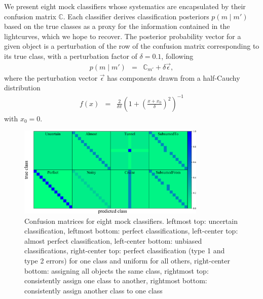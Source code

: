 We present eight mock classifiers whose systematics are encapsulated by their confusion matrix $\mathbb{C}$.
Each classifier derives classification posteriors $p(m \mid m')$ based on the true classes as a proxy for the information contained in the lightcurves, which we hope to recover.
The posterior probability vector for a given object is a perturbation of the row of the confusion matrix corresponding to its true class, with a perturbation factor of $\delta=0.1$, following
\begin{eqnarray}
  \label{eq:cmtoprob}
  p(m \mid m') &=& \mathbb{C}_{m'} + \delta\vec{\epsilon},
\end{eqnarray}
where the perturbation vector $\vec{\epsilon}$ has components drawn from a half-Cauchy distribution
\begin{eqnarray}
  \label{eq:cauchy}
  f(x) &=& \frac{2}{\delta\pi} \left(1+\left(\frac{x+x_{0}}{\delta}\right)^{2}\right)^{-1}
\end{eqnarray}
with $x_{0}=0$.


\begin{figure}
	\begin{center}
    \includegraphics[width=0.8\textwidth]{./fig/all_sim_cm.png}
		\caption{Confusion matrices for eight mock classifiers.
    leftmost top: uncertain classification,
    leftmost bottom: perfect classifications,
    left-center top: almost perfect classification,
    left-center bottom: unbiased classifications,
    right-center top: perfect classification (type 1 and type 2 errors) for one class and uniform for all others,
    right-center bottom: assigning all objects the same class,
    rightmost top: consistently assign one class to another,
    rightmost bottom: consistently assign another class to one class}
		\label{fig:mock_cm}
	\end{center}
\end{figure}

